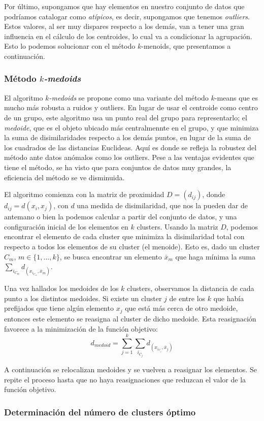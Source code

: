 Por último, supongamos que hay elementos en nuestro conjunto de datos que podríamos catalogar como \textit{atípicos}, es decir, supongamos que tenemos \textit{outliers}. Estos valores, al 
ser muy dispares respecto a los demás, van a tener una gran influencia en el cálculo de los centroides, lo cual va a condicionar la agrupación. Esto lo podemos solucionar con el 
método $k$-menoids, que presentamos a continuación.

\subsubsection{Método \textit{$k$-medoids}}

El algoritmo \textit{$k$-medoids} se propone como una variante del método $k$-means que es mucho más robusta a ruidos y outliers. En lugar de 
usar el centroide como centro de un grupo, este algoritmo usa un punto real del grupo para representarlo; el \textit{medoide}, que es el objeto ubicado
más centralmennte en el grupo, y que minimiza la suma de disimilaridades respecto a los demás puntos, en lugar de la suma de los cuadrados de las distancias Euclideas. Aquí es donde
se refleja la robustez del método ante datos anómalos como los outliers. Pese a las ventajas evidentes que tiene el método, se ha visto que para conjuntos de 
datos muy grandes, la eficiencia del método se ve disminuida. \newline

El algoritmo comienza con la matriz de proximidad $D = (d_{ij})$, donde $d_{ij} = d(x_{i},x_{j})$, con $d$ una medida de disimilaridad, que nos la pueden dar de antemano o
bien la podemos calcular a partir del conjunto de datos, y una configuración inicial de los elementos en $k$ clusters. Usando la matriz $D$, podemos encontrar el elemento de 
cada cluster que minimiza la disimilaridad total con respecto a todos los elementos de su cluster (el menoide). Esto es, dado un cluster $C_{m}$, $m\in\{1,\dots,k\}$, se busca encontrar
un elemento $\bar{x}_{m}$ que haga mínima la suma $\sum_{i_{C_{m}}}d_(x_{i_{C_{m}}},\bar{x}_{m})$. \newline

Una vez hallados los medoides de los $k$ clusters, observamos la distancia de cada punto a los distintos medoides. Si existe un cluster $j$ de entre los $k$ que había prefijados que 
tiene algún elemento $x_{j}$ que está más cerca de otro medoide, entonces este elemento se reasigna al cluster de dicho medoide. Esta reasignación favorece a la minimización de la función
objetivo:
\[
d_{medoid} = \sum_{j=1}^{k}\sum_{i_{C_{j}}}d_(x_{i_{C_{j}}},\bar{x}_{j})
\]

A continuación se relocalizan medoides y se vuelven a reasignar los elementos. Se repite el proceso hasta que no haya reasignaciones que reduzcan 
el valor de la función objetivo.



\subsubsection{Determinación del número de clusters óptimo}
